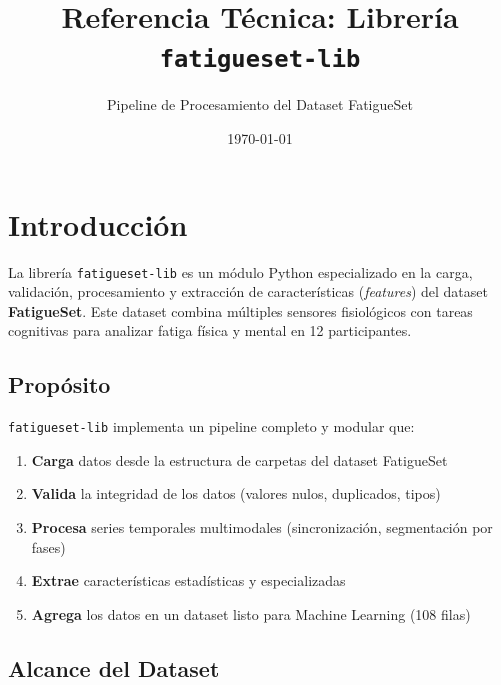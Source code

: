 \documentclass[12pt,a4paper]{article}
\title{\textbf{Referencia Técnica: Librería \texttt{fatigueset-lib}}}
\author{Pipeline de Procesamiento del Dataset FatigueSet}
\date{\today}
\begin{document}
\maketitle

\tableofcontents
\newpage

\section{Introducción}

La librería \texttt{fatigueset-lib} es un módulo Python especializado en la carga, validación, procesamiento y extracción de características (\textit{features}) del dataset \textbf{FatigueSet}. Este dataset combina múltiples sensores fisiológicos con tareas cognitivas para analizar fatiga física y mental en 12 participantes.

\subsection{Propósito}

\texttt{fatigueset-lib} implementa un pipeline completo y modular que:
\begin{enumerate}
    \item \textbf{Carga} datos desde la estructura de carpetas del dataset FatigueSet
    \item \textbf{Valida} la integridad de los datos (valores nulos, duplicados, tipos)
    \item \textbf{Procesa} series temporales multimodales (sincronización, segmentación por fases)
    \item \textbf{Extrae} características estadísticas y especializadas
    \item \textbf{Agrega} los datos en un dataset listo para Machine Learning (108 filas)
\end{enumerate}

\subsection{Alcance del Dataset}
\end{document}
